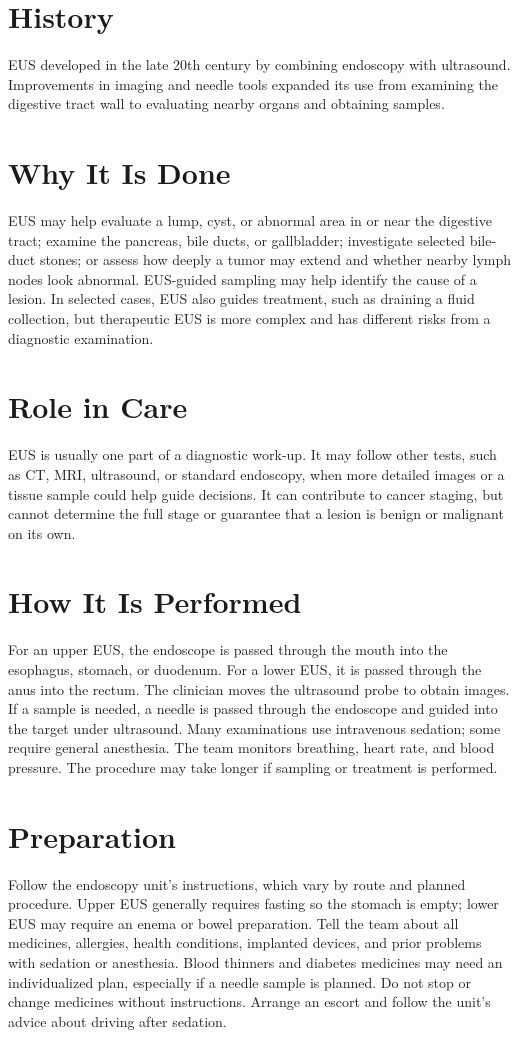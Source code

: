 \section*{History}
EUS developed in the late 20th century by combining endoscopy with ultrasound. Improvements in imaging and needle tools expanded its use from examining the digestive tract wall to evaluating nearby organs and obtaining samples.

\section*{Why It Is Done}
EUS may help evaluate a lump, cyst, or abnormal area in or near the digestive tract; examine the pancreas, bile ducts, or gallbladder; investigate selected bile-duct stones; or assess how deeply a tumor may extend and whether nearby lymph nodes look abnormal. EUS-guided sampling may help identify the cause of a lesion. In selected cases, EUS also guides treatment, such as draining a fluid collection, but therapeutic EUS is more complex and has different risks from a diagnostic examination.

\section*{Role in Care}
EUS is usually one part of a diagnostic work-up. It may follow other tests, such as CT, MRI, ultrasound, or standard endoscopy, when more detailed images or a tissue sample could help guide decisions. It can contribute to cancer staging, but cannot determine the full stage or guarantee that a lesion is benign or malignant on its own.

\section*{How It Is Performed}
For an upper EUS, the endoscope is passed through the mouth into the esophagus, stomach, or duodenum. For a lower EUS, it is passed through the anus into the rectum. The clinician moves the ultrasound probe to obtain images. If a sample is needed, a needle is passed through the endoscope and guided into the target under ultrasound. Many examinations use intravenous sedation; some require general anesthesia. The team monitors breathing, heart rate, and blood pressure. The procedure may take longer if sampling or treatment is performed.

\section*{Preparation}
Follow the endoscopy unit's instructions, which vary by route and planned procedure. Upper EUS generally requires fasting so the stomach is empty; lower EUS may require an enema or bowel preparation. Tell the team about all medicines, allergies, health conditions, implanted devices, and prior problems with sedation or anesthesia. Blood thinners and diabetes medicines may need an individualized plan, especially if a needle sample is planned. Do not stop or change medicines without instructions. Arrange an escort and follow the unit's advice about driving after sedation.

